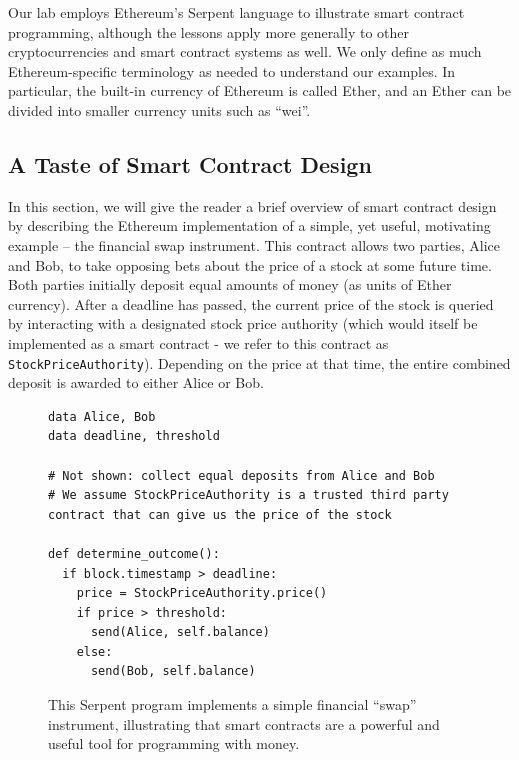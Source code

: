 \documentclass{llncs}
\renewcommand{\paragraph}[1]{\vspace{5pt} \noindent{\bf #1}}
\begin{document}
\paragraph{Ethereum Specifics.}
Our lab employs Ethereum's Serpent language 
to illustrate smart contract programming, although the lessons apply more generally to other cryptocurrencies and smart contract systems as well.
We only define as much Ethereum-specific terminology as needed to understand our examples.
In particular, the built-in currency of Ethereum is called Ether, and 
an Ether can be divided into smaller currency units such as ``wei''.


\subsection{A Taste of Smart Contract Design}

In this section, we will give the reader a brief overview of smart contract design by describing the Ethereum implementation of a simple, yet useful, motivating example -- the financial swap instrument. This contract allows two parties, Alice and Bob, to take opposing bets about the price of a stock at some future time. Both parties initially deposit equal amounts of money (as units of Ether currency). After a deadline has passed, the current price of the stock is queried by interacting with a designated stock price authority (which would itself be implemented as a smart contract - we refer to this contract as \texttt{StockPriceAuthority}). Depending on the price at that time, the entire combined deposit is awarded to either Alice or Bob.

\begin{figure}
\begin{mdframed}
\begin{verbatim}
data Alice, Bob
data deadline, threshold

# Not shown: collect equal deposits from Alice and Bob
# We assume StockPriceAuthority is a trusted third party contract that can give us the price of the stock

def determine_outcome():
  if block.timestamp > deadline: 
    price = StockPriceAuthority.price()
    if price > threshold:
      send(Alice, self.balance)
    else:
      send(Bob, self.balance)
\end{verbatim}
\end{mdframed}
\caption{This Serpent program implements a simple financial ``swap'' instrument, illustrating that smart contracts are a powerful and useful tool for programming with money.}
\end{figure}
\end{document}
